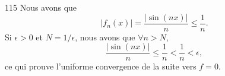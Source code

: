 

\begin{corrige}{115}
Nous avons que
\begin{equation}
	| f_n(x) |=\frac{ | \sin(nx) | }{ n }\leq \frac{ 1 }{ n }.
\end{equation}
Si $\epsilon>0$ et $N=1/\epsilon$, nous avons que $\forall n>N$,
\begin{equation}
	\frac{ | \sin(nx) | }{ n }\leq \frac{ 1 }{ n }<\frac{1}{ n }<\epsilon,
\end{equation}
ce qui prouve l'uniforme convergence de la suite vers $f=0$.
\end{corrige}
